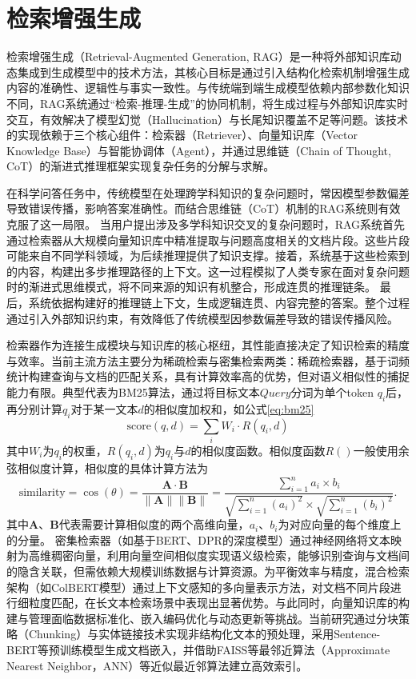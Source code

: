 \section{检索增强生成}
检索增强生成（Retrieval-Augmented Generation, RAG）\cite{karpukhin2020dense,izacard2023atlas,yao2023editing,feng2023trends,xu2023retrieval,balaguer2024rag}是一种将外部知识库动态集成到生成模型中的技术方法，其核心目标是通过引入结构化检索机制增强生成内容的准确性、逻辑性与事实一致性。与传统端到端生成模型依赖内部参数化知识不同，RAG系统通过“检索-推理-生成”的协同机制，将生成过程与外部知识库实时交互，有效解决了模型幻觉（Hallucination）与长尾知识覆盖不足等问题。该技术的实现依赖于三个核心组件：检索器（Retriever）、向量知识库（Vector Knowledge Base）与智能协调体（Agent），并通过思维链（Chain of Thought, CoT）的渐进式推理框架实现复杂任务的分解与求解。

在科学问答任务中，传统模型在处理跨学科知识的复杂问题时，常因模型参数偏差导致错误传播，影响答案准确性。而结合思维链（CoT）机制的RAG系统则有效克服了这一局限。
当用户提出涉及多学科知识交叉的复杂问题时，RAG系统首先通过检索器从大规模向量知识库中精准提取与问题高度相关的文档片段。这些片段可能来自不同学科领域，为后续推理提供了知识支撑。接着，系统基于这些检索到的内容，构建出多步推理路径的上下文。这一过程模拟了人类专家在面对复杂问题时的渐进式思维模式，将不同来源的知识有机整合，形成连贯的推理链条。
最后，系统依据构建好的推理链上下文，生成逻辑连贯、内容完整的答案。整个过程通过引入外部知识约束，有效降低了传统模型因参数偏差导致的错误传播风险。

检索器作为连接生成模块与知识库的核心枢纽，其性能直接决定了知识检索的精度与效率。当前主流方法主要分为稀疏检索与密集检索两类：稀疏检索器，基于词频统计构建查询与文档的匹配关系，具有计算效率高的优势，但对语义相似性的捕捉能力有限。典型代表为BM25\cite{robertson2009probabilistic}算法，通过将目标文本$Query$分词为单个token $q_i$后，再分别计算$q_i$对于某一文本$d$的相似度加权和，如公式\ref{eq:bm25}
\begin{equation}
  \label{eq:bm25}
  \text{score}(q, d) = \sum_{i} W_i \cdot R(q_i, d)
  \end{equation}
其中$W_i$为$q_i$的权重，$R(q_i, d)$为$q_i$与$d$的相似度函数。相似度函数$R()$一般使用余弦相似度计算，相似度的具体计算方法为
\begin{equation}
  \text{similarity} = \cos(\theta) = \frac{\mathbf{A} \cdot \mathbf{B}}{\|\mathbf{A}\|\|\mathbf{B}\|} = \frac{\sum_{i=1}^{n} a_i \times b_i}{\sqrt{\sum_{i=1}^{n} (a_i)^2} \times \sqrt{\sum_{i=1}^{n} (b_i)^2}}.
  \end{equation}
其中$\mathbf{A}$、$\mathbf{B}$代表需要计算相似度的两个高维向量，$a_i$、$b_i$为对应向量的每个维度上的分量。
密集检索器（如基于BERT、DPR的深度模型）通过神经网络将文本映射为高维稠密向量，利用向量空间相似度实现语义级检索，能够识别查询与文档间的隐含关联，但需依赖大规模训练数据与计算资源。为平衡效率与精度，混合检索架构（如ColBERT模型）通过上下文感知的多向量表示方法，对文档不同片段进行细粒度匹配，在长文本检索场景中表现出显著优势。与此同时，向量知识库的构建与管理面临数据标准化、嵌入编码优化与动态更新等挑战。当前研究通过分块策略（Chunking）与实体链接技术实现非结构化文本的预处理，采用Sentence-BERT等预训练模型生成文档嵌入，并借助FAISS等最邻近算法（Approximate Nearest Neighbor，ANN）等近似最近邻算法建立高效索引。

